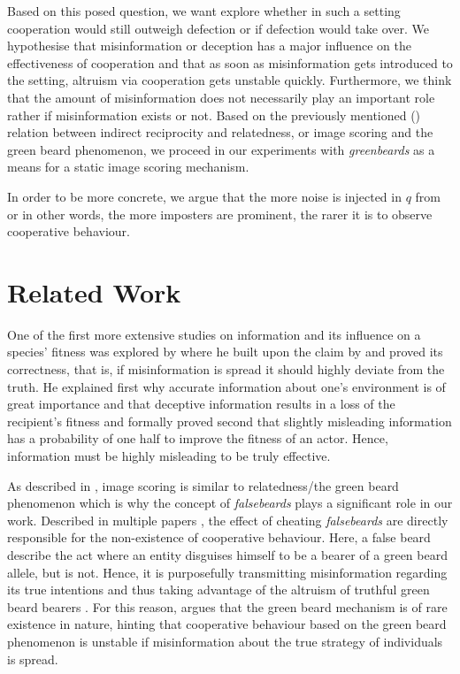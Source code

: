 \documentclass[sigconf]{acmart}
\newcommand{\greenbeards}{\textit{greenbeards}\xspace}
\begin{document}
    Based on this posed question, we want explore whether in such a setting cooperation would still outweigh defection or if defection would take over.
    We hypothesise that misinformation or deception has a major influence on the effectiveness of cooperation and that as soon as misinformation gets introduced to the setting, altruism via cooperation gets unstable quickly.
    Furthermore, we think that the amount of misinformation does not necessarily play an important role rather if misinformation exists or not.
    Based on the previously mentioned () relation between indirect reciprocity and relatedness, or image scoring and the green beard phenomenon, we proceed in our experiments with \greenbeards as a means for a static image scoring mechanism.

    In order to be more concrete, we argue that the more noise is injected in $q$ from  or in other words, the more imposters are prominent, the rarer it is to observe cooperative behaviour.


    \section{Related Work}\label{sec:related_work}
    One of the first more extensive studies on information and its influence on a species' fitness was explored by \citeauthor{wallace_misinformation_1973} \cite{wallace_misinformation_1973} where he built upon the claim by \citeauthor{fisherGeneticalTheoryNatural1930} \cite{fisherGeneticalTheoryNatural1930} and proved its correctness, that is, if misinformation is spread it should highly deviate from the truth.
    He explained first why accurate information about one's environment is of great importance and that deceptive information results in a loss of the recipient's fitness and formally proved second that slightly misleading information has a probability of one half to improve the fitness of an actor.
    Hence, information must be highly misleading to be truly effective.

    As described in , image scoring is similar to relatedness/the green beard phenomenon which is why the concept of \textit{falsebeards} plays a significant role in our work.
    Described in multiple papers \cite{SelfishGeneRichard,roberts_kin_2019,west_altruism_2010}, the effect of cheating \textit{falsebeards} are directly responsible for the non-existence of cooperative behaviour.
    Here, a false beard describe the act where an entity disguises himself to be a bearer of a green beard allele, but is not.
    Hence, it is purposefully transmitting misinformation regarding its true intentions and thus taking advantage of the altruism of truthful green beard bearers \cite{SelfishGeneRichard}.
    For this reason, \citeauthor{SelfishGeneRichard} \cite{SelfishGeneRichard} argues that the green beard mechanism is of rare existence in nature, hinting that cooperative behaviour based on the green beard phenomenon is unstable if misinformation about the true strategy of individuals is spread.
\end{document}
